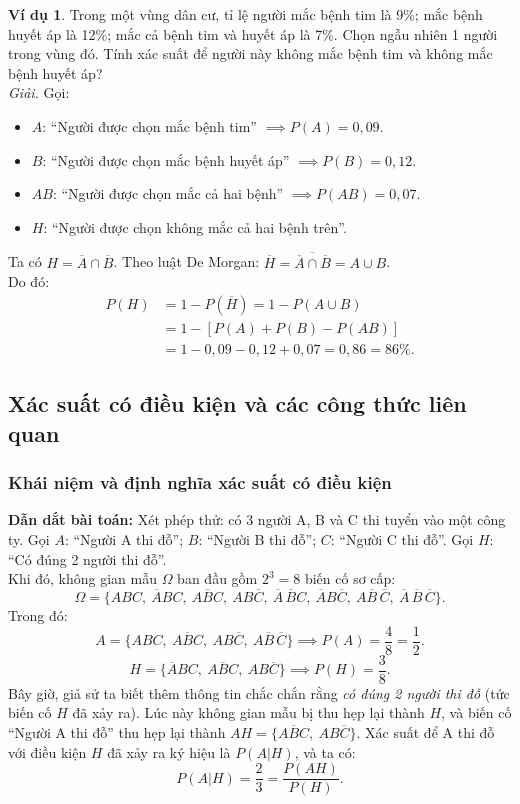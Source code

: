 \documentclass[12pt,a4paper]{article}
\theoremstyle{definition}
\newtheorem{vidu}{Ví dụ}[section]
\begin{document}
\begin{vidu}
Trong một vùng dân cư, tỉ lệ người mắc bệnh tim là 9\%; mắc bệnh huyết áp là 12\%; mắc cả bệnh tim và huyết áp là 7\%. Chọn ngẫu nhiên 1 người trong vùng đó. Tính xác suất để người này không mắc bệnh tim và không mắc bệnh huyết áp?\\
\textit{Giải.} Gọi:
\begin{itemize}
    \item $A$: ``Người được chọn mắc bệnh tim'' $\implies P(A) = 0{,}09$.
    \item $B$: ``Người được chọn mắc bệnh huyết áp'' $\implies P(B) = 0{,}12$.
    \item $AB$: ``Người được chọn mắc cả hai bệnh'' $\implies P(AB) = 0{,}07$.
    \item $H$: ``Người được chọn không mắc cả hai bệnh trên''.
\end{itemize}
Ta có $H = \overline{A} \cap \overline{B}$. Theo luật De Morgan: $\overline{H} = \overline{\overline{A} \cap \overline{B}} = A \cup B$.\\
Do đó:
\begin{align*}
P(H) &= 1 - P(\overline{H}) = 1 - P(A \cup B) \\
     &= 1 - [P(A) + P(B) - P(AB)] \\
     &= 1 - 0{,}09 - 0{,}12 + 0{,}07 = 0{,}86 = 86\%.
\end{align*}
\end{vidu}

\subsection{Xác suất có điều kiện và các công thức liên quan}

\subsubsection{Khái niệm và định nghĩa xác suất có điều kiện}
\textbf{Dẫn dắt bài toán:} Xét phép thử: có 3 người A, B và C thi tuyển vào một công ty.
Gọi $A$: ``Người A thi đỗ''; $B$: ``Người B thi đỗ''; $C$: ``Người C thi đỗ''.
Gọi $H$: ``Có đúng 2 người thi đỗ''.\\
Khi đó, không gian mẫu $\Omega$ ban đầu gồm $2^3 = 8$ biến cố sơ cấp:
\[
\Omega = \{ABC,\ \overline{A}BC,\ A\overline{B}C,\ AB\overline{C},\ \overline{A}\,\overline{B}C,\ \overline{A}B\overline{C},\ A\overline{B}\,\overline{C},\ \overline{A}\,\overline{B}\,\overline{C}\}.
\]
Trong đó:
\[
A = \{ABC,\ A\overline{B}C,\ AB\overline{C},\ A\overline{B}\,\overline{C}\} \implies P(A) = \frac{4}{8} = \frac{1}{2}.
\]
\[
H = \{\overline{A}BC,\ A\overline{B}C,\ AB\overline{C}\} \implies P(H) = \frac{3}{8}.
\]
Bây giờ, giả sử ta biết thêm thông tin chắc chắn rằng \textit{có đúng 2 người thi đỗ} (tức biến cố $H$ đã xảy ra).
Lúc này không gian mẫu bị thu hẹp lại thành $H$, và biến cố ``Người A thi đỗ'' thu hẹp lại thành $AH = \{A\overline{B}C,\ AB\overline{C}\}$.
Xác suất để A thi đỗ với điều kiện $H$ đã xảy ra ký hiệu là $P(A|H)$, và ta có:
\[
P(A|H) = \frac{2}{3} = \frac{P(AH)}{P(H)}.
\]
\end{document}
